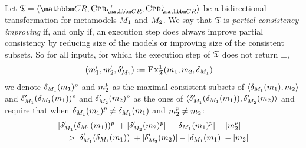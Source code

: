 \begin{definition}
    \label{def:partialconsistencyimprovingtransformation}
    Let $\transformation{T} = \tupled{\consistencyrelationset{CR}, \consistencypreservationrule{\consistencyrelationset{CR}}^{\rightarrow}, \consistencypreservationrule{\consistencyrelationset{CR}}^{\leftarrow}}$ be a bidirectional transformation for metamodels $M_{1}$ and $M_{2}$.
    We say that $\mathfrak{T}$ is \emph{partial-consistency-improving} if, and only if, an execution step does always improve partial consistency by reducing size of the models or improving size of the consistent subsets.
    So for all inputs, for which the execution step of $\mathfrak{T}$ does not return $\bot$,
    \begin{align*}
        & (m_{1}', m_{2}', \delta_{M_{1}}') := \textsc{Ex}_{\mathfrak{T}}^1(m_{1}, m_{2}, \delta_{M_{1}})
    \end{align*}
    we denote $\delta_{M_{1}}(m_{1})^p$ and $m_{2}^p$ as the maximal consistent subsets of $\langle \delta_{M_{1}}(m_{1}), m_{2} \rangle$ and $\delta_{M_{1}}'(\delta_{M_{1}}(m_{1}))^p$ and $\delta_{M_{2}}'(m_{2})^p$ as the ones of $\langle \delta_{M_{1}}'(\delta_{M_{1}}(m_{1})), \delta_{M_{2}}'(m_{2}) \rangle$
    and require that when $\delta_{M_{1}}(m_{1})^p \neq \delta_{M_{1}}(m_{1})$ and $m_{2}^p \neq m_{2}$:
    \begin{align*}
        &
        \lvert\delta_{M_{1}}'(\delta_{M_{1}}(m_{1}))^p\rvert + \lvert\delta_{M_{2}}'(m_{2})^p\rvert 
        - \lvert\delta_{M_{1}}(m_{1})^p\rvert - \lvert m_{2}^p\rvert \\
        & \hspace{1em}
        > \lvert\delta_{M_{1}}'(\delta_{M_{1}}(m_{1}))\rvert + \lvert\delta_{M_{2}}'(m_{2})\rvert 
        - \lvert\delta_{M_{1}}(m_{1})\rvert - \lvert m_{2}\rvert
    \end{align*}
\end{definition}

